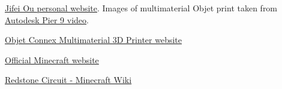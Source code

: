 \begin{singlespace}
\renewcommand{\bibname}{External Media}
\begin{thebibliography}{1}

\href{http://ou-jifei.com/}{Jifei Ou personal website}.  Images of multimaterial Objet print taken from \href{https://vimeo.com/127666944#t=89s}{Autodesk Pier 9 video}.

\href{http://www.stratasys.com/3d-printers/production-series/connex3-systems}{Objet Connex Multimaterial 3D Printer website}

\href{https://minecraft.net/}{Official Minecraft website}

\href{http://minecraft.gamepedia.com/Redstone_circuit}{Redstone Circuit - Minecraft Wiki}

\end{thebibliography}
\end{singlespace}
